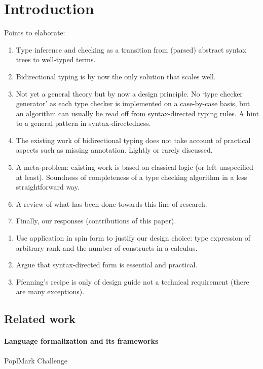 
\section{Introduction}\label{sec:intro}

Points to elaborate:
\begin{enumerate}
  \item Type inference and checking as a transition from (parsed) abstract syntax trees to well-typed terms.
  \item Bidirectional typing is by now the only solution that scales well.
  \item Not yet a general theory but by now a design principle.
    No `type checker generator' as each type checker is implemented on a case-by-case basis, but an algorithm can usually be read off from syntax-directed typing rules.
    A hint to a general pattern in syntax-directedness.
  \item The existing work of bidirectional typing does not take account of practical aspects such as missing annotation.
    Lightly or rarely discussed.
  \item A meta-problem: existing work is based on classical logic (or left unspecified at least).
    Soundness of completeness of a type checking algorithm in a less straightforward way.
  \item A review of what has been done towards this line of research.
  \item Finally, our responses (contributions of this paper).
\end{enumerate}


\begin{enumerate}
  \item Use application in spin form to justify our design choice: type expression of arbitrary rank and the number of constructs in a calculus.
  \item Argue that syntax-directed form is essential and practical.
  \item Pfenning's recipe is only of design guide not a technical requirement (there are many exceptions).
\end{enumerate}

\subsection{Related work}

\citep{Xie2018}
\paragraph{Language formalization and its frameworks}
\cite{Wadler2022}
PoplMark Challenge~\citep{Aydemir2005}

